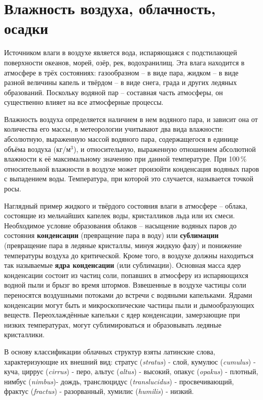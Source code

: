 \section{Влажность воздуха, облачность, осадки}

Источником влаги в воздухе является вода, испаряющаяся с подстилающей
поверхности океанов, морей, озёр, рек, водохранилищ. Эта влага
находится в атмосфере в трёх состояниях: газообразном \--- в виде
пара, жидком \--- в виде разной величины капель и твёрдом \--- в виде
снега, града и других ледяных образований. Поскольку водяной пар \---
составная часть атмосферы, он существенно влияет на все атмосферные
процессы.

Влажность воздуха
определяется наличием в нем водяного пара, и зависит она от количества
его массы, в метеорологии учитывают два вида влажности: абсолютную,
выраженную массой водяного пара, содержащегося в единице объёма
воздуха (кг/м$^3$), и относительную, выраженную отношением абсолютной
влажности к её максимальному значению при данной температуре. При
100\,\% относительной влажности в воздухе может произойти конденсация
водяных паров с выпадением воды. Температура, при которой это
случается, называется точкой росы.

Наглядный пример жидкого и твёрдого состояния влаги в атмосфере \---
облака, состоящие из мельчайших капелек воды, кристалликов льда или их
смеси. Необходимое условие образования облаков \--- насыщение водяных
паров до состояния \textbf{конденсации} (превращение пара в воду) или
\textbf{сублимации} (превращение пара в ледяные кристаллы, минуя
жидкую фазу) и понижение температуры воздуха до критической. Кроме
того, в воздухе должны находиться так называемые \textbf{ядра
  конденсации} (или сублимации). Основная масса ядер конденсации
состоит из частиц соли, попавших в атмосферу из испаряющихся водной
пыли и брызг во время штормов. Взвешенные в воздухе частицы соли
переносятся воздушными потоками до встречи с водяными
капельками. Ядрами конденсации могут быть и микроскопические частицы
пыли и дымообразующих веществ. Переохлаждённые капельки с ядер
конденсации, замерзающие при низких температурах, могут
сублимироваться и образовывать ледяные кристаллики.

В основу классификации облачных структур взяты латинские слова,
характеризующие их внешний вид: стратус (\textit{stratus}) - слой,
кумулюс (\textit{cumulus}) - куча, циррус (\textit{cirrus}) - перо,
альтус (\textit{altus}) - высокий, опакус (\textit{opakus}) - плотный,
нимбус (\textit{nimbus})- дождь, транслюцидус (\textit{translucidus})
- просвечивающий, фрактус (\textit{fractus}) - разорванный, хумилис
(\textit{humilis}) - низкий.

